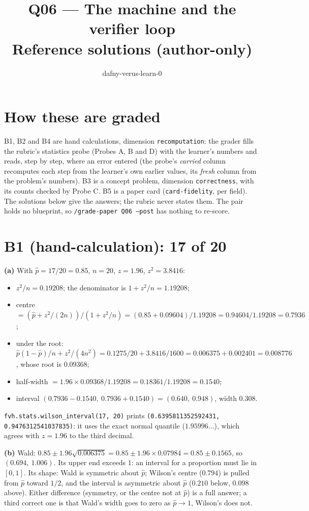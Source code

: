 \documentclass[11pt]{article}
\title{Q06 --- The machine and the verifier loop \\ \large Reference solutions (author-only)}
\author{dafny-verus-learn-0}
\date{}
\begin{document}
\maketitle

\section*{How these are graded}
B1, B2 and B4 are hand calculations, dimension \texttt{recomputation}: the
grader fills the rubric's statistics probe (Probes A, B and D) with the
learner's numbers and reads, step by step, where an error entered (the
probe's \emph{carried} column recomputes each step from the learner's own
earlier values, its \emph{fresh} column from the problem's numbers). B3 is a
concept problem, dimension \texttt{correctness}, with its counts checked by
Probe C. B5 is a paper card (\texttt{card-fidelity}, per field). The solutions
below give the answers; the rubric never states them. The pair holds no
blueprint, so \texttt{/grade-paper Q06 --post} has nothing to re-score.

\section*{B1 (hand-calculation): 17 of 20}

\textbf{(a)} With $\hat p = 17/20 = 0.85$, $n = 20$, $z = 1.96$, $z^2 = 3.8416$:
\begin{itemize}
\item $z^2/n = 0.19208$; the denominator is $1 + z^2/n = 1.19208$;
\item centre $= (\hat p + z^2/(2n)) / (1 + z^2/n) = (0.85 + 0.09604)/1.19208
  = 0.94604/1.19208 = 0.7936$;
\item under the root: $\hat p(1-\hat p)/n + z^2/(4n^2) = 0.1275/20 + 3.8416/1600
  = 0.006375 + 0.002401 = 0.008776$, whose root is $0.09368$;
\item half-width $= 1.96 \times 0.09368 / 1.19208 = 0.18361/1.19208 = 0.1540$;
\item interval $(0.7936 - 0.1540,\ 0.7936 + 0.1540) = (0.640,\ 0.948)$, width
  $0.308$.
\end{itemize}
\texttt{fvh.stats.wilson\_interval(17, 20)} prints
\texttt{(0.6395811352592431, 0.9476312541037835)}: it uses the exact normal
quantile ($1.95996\ldots$), which agrees with $z = 1.96$ to the third decimal.

\textbf{(b)} Wald: $0.85 \pm 1.96\sqrt{0.006375} = 0.85 \pm 1.96 \times 0.07984 =
0.85 \pm 0.1565$, so $(0.694,\ 1.006)$. Its upper end exceeds $1$: an interval
for a proportion must lie in $[0, 1]$. Its shape: Wald is symmetric about
$\hat p$; Wilson's centre ($0.794$) is pulled from $\hat p$ toward $1/2$, and
the interval is asymmetric about $\hat p$ ($0.210$ below, $0.098$ above). Either
difference (symmetry, or the centre not at $\hat p$) is a full answer; a third
correct one is that Wald's width goes to zero as $\hat p \to 1$, Wilson's does
not.
\end{document}
